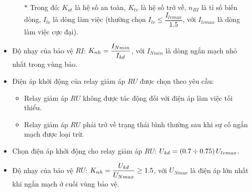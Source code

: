 \documentclass[12pt,a4paper]{article}
\begin{document}
\begin{itemize}
\begin{itemize}
				\item[$\ast$] Trong đó: $K_{at}$ là hệ số an toàn, $K_{tv}$ là hệ số trở về, $n_{BI}$ là tỉ số biến dòng, $I_{lv}$ là dòng làm việc (thường chọn $I_{lv} \leq \dfrac{I_{lvmax}}{1.5}$, với $I_{lvmax}$ là dòng làm việc cực đại).
			\end{itemize}
		
		\item Độ nhạy của bảo vệ $RI$: $K_{nh} = \dfrac{I_{Nmin}}{I_{\text{\textit{kđ}}}}$, với $I_{Nmin}$ là dòng ngắn mạch nhỏ nhất trong vùng bảo.
		
		\item Điện áp khởi động của relay giảm áp $RU$ được chọn theo yêu cầu:
			\begin{itemize}
				\item Relay giảm áp $RU$ không được tác động đối với điện áp làm việc tối thiểu.
				
				\item Relay giảm áp $RU$ phải trở về trạng thái bình thường sau khi sự cố ngắn mạch được loại trừ.
			\end{itemize}
			
		\item Chọn điện áp khởi động cho relay giảm áp $RU$: $U_{\text{\textit{kđ}}} = \left({0.7 \div 0.75}\right)U_{lvmax}$.
		
		\item Độ nhạy của bảo vệ $RU$: $K_{nh} = \dfrac{U_{\text{\textit{kđ}}}}{U_{Nmax}} \geq 1.5$, với $U_{Nmax}$ là điện áp lớn nhất khi ngắn mạch ở cuối vùng bảo vệ.
	\end{itemize}
	
\end{document}
